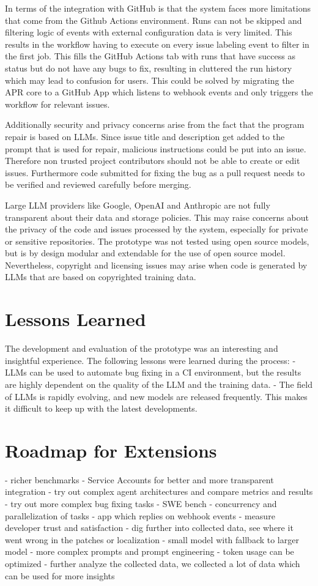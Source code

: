 In terms of the integration with GitHub is that the system faces more limitations that come from the Github Actions environment. Runs can not be skipped and filtering logic of events with external configuration data is very limited. This results in the workflow having to execute on every issue labeling event to filter in the first job. This fills the GitHub Actions tab with runs that have success as status but do not have any bugs to fix, resulting in cluttered the run history which may lead to confusion for users. This could be solved by migrating the APR core to a GitHub App which listens to webhook events and only triggers the workflow for relevant issues.

Additionally security and privacy concerns arise from the fact that the program repair is based on LLMs. Since issue title and description get added to the prompt that is used for repair, malicious instructions could be put into an issue. Therefore non trusted project contributors should not be able to create or edit issues. Furthermore code submitted for fixing the bug as a pull request needs to be verified and reviewed carefully before merging.

Large LLM providers like Google, OpenAI and Anthropic are not fully transparent about their data and storage policies. This may raise concerns about the privacy of the code and issues processed by the system, especially for private or sensitive repositories. The prototype was not tested using open source models, but is by design modular and  extendable for the use of open source model. Nevertheless, copyright and licensing issues may arise when code is generated by LLMs that are based on copyrighted training data. \cite{sauvolaFutureSoftwareDevelopment2024, houLargeLanguageModels2024}


\section{Lessons Learned}
The development and evaluation of the prototype was an interesting and insightful experience. The following lessons were learned during the process:
- LLMs can be used to automate bug fixing in a CI environment, but the results are highly dependent on the quality of the LLM and the training data.
- The field of LLMs is rapidly evolving, and new models are released frequently. This makes it difficult to keep up with the latest developments.


\section{Roadmap for Extensions} \label{section:roadmap}
- richer benchmarks
- Service Accounts for better and more transparent integration
- try out complex agent architectures and compare metrics and results
- try out more complex bug fixing tasks - SWE bench
- concurrency and parallelization of tasks
- app which replies on webhook events
- measure developer trust and satisfaction
- dig further into collected data, see where it went wrong in the patches or localization
- small model with fallback to larger model
- more complex prompts and prompt engineering
- token usage can be optimized
- further analyze the collected data, we collected a lot of data which can be used for more insights
